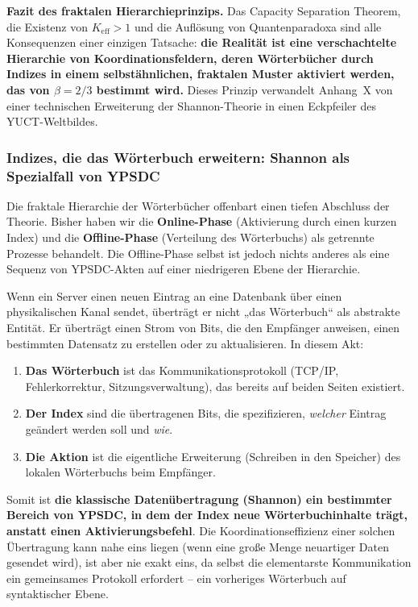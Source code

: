 \documentclass[12pt,a4paper]{article}
\theoremstyle{remark}
\begin{document}
	\noindent
	\textbf{Fazit des fraktalen Hierarchieprinzips.}
	Das Capacity Separation Theorem, die Existenz von $K_{\mathrm{eff}}>1$ und die Auflösung von Quantenparadoxa sind alle Konsequenzen einer einzigen Tatsache: \textbf{die Realität ist eine verschachtelte Hierarchie von Koordinationsfeldern, deren Wörterbücher durch Indizes in einem selbstähnlichen, fraktalen Muster aktiviert werden, das von $\beta=2/3$ bestimmt wird.} Dieses Prinzip verwandelt Anhang~X von einer technischen Erweiterung der Shannon-Theorie in einen Eckpfeiler des YUCT-Weltbildes.
	
	\subsubsection{Indizes, die das Wörterbuch erweitern: Shannon als Spezialfall von YPSDC}
	
	Die fraktale Hierarchie der Wörterbücher offenbart einen tiefen Abschluss der Theorie. Bisher haben wir die \textbf{Online-Phase} (Aktivierung durch einen kurzen Index) und die \textbf{Offline-Phase} (Verteilung des Wörterbuchs) als getrennte Prozesse behandelt. Die Offline-Phase selbst ist jedoch nichts anderes als eine Sequenz von YPSDC-Akten auf einer niedrigeren Ebene der Hierarchie.
	
	Wenn ein Server einen neuen Eintrag an eine Datenbank über einen physikalischen Kanal sendet, überträgt er nicht „das Wörterbuch“ als abstrakte Entität. Er überträgt einen Strom von Bits, die den Empfänger anweisen, einen bestimmten Datensatz zu erstellen oder zu aktualisieren. In diesem Akt:
	
	\begin{enumerate}[leftmargin=*]
		\item \textbf{Das Wörterbuch} ist das Kommunikationsprotokoll (TCP/IP, Fehlerkorrektur, Sitzungsverwaltung), das bereits auf beiden Seiten existiert.
		\item \textbf{Der Index} sind die übertragenen Bits, die spezifizieren, \emph{welcher} Eintrag geändert werden soll und \emph{wie}.
		\item \textbf{Die Aktion} ist die eigentliche Erweiterung (Schreiben in den Speicher) des lokalen Wörterbuchs beim Empfänger.
	\end{enumerate}
	
	Somit ist \textbf{die klassische Datenübertragung (Shannon) ein bestimmter Bereich von YPSDC, in dem der Index neue Wörterbuchinhalte trägt, anstatt einen Aktivierungsbefehl}. Die Koordinationseffizienz einer solchen Übertragung kann nahe eins liegen (wenn eine große Menge neuartiger Daten gesendet wird), ist aber nie exakt eins, da selbst die elementarste Kommunikation ein gemeinsames Protokoll erfordert – ein vorheriges Wörterbuch auf syntaktischer Ebene.
	
\end{document}
